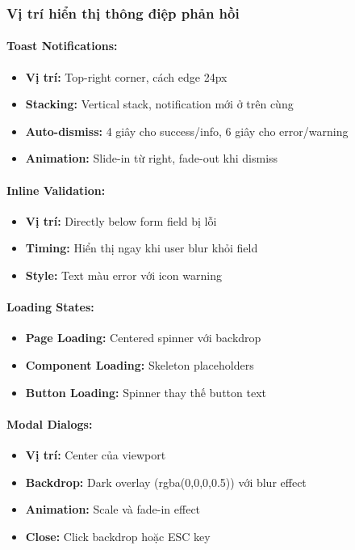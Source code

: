 \subsubsection{Vị trí hiển thị thông điệp phản hồi}

\paragraph{Toast Notifications:}
\begin{itemize}
    \item \textbf{Vị trí:} Top-right corner, cách edge 24px
    \item \textbf{Stacking:} Vertical stack, notification mới ở trên cùng
    \item \textbf{Auto-dismiss:} 4 giây cho success/info, 6 giây cho error/warning
    \item \textbf{Animation:} Slide-in từ right, fade-out khi dismiss
\end{itemize}

\paragraph{Inline Validation:}
\begin{itemize}
    \item \textbf{Vị trí:} Directly below form field bị lỗi
    \item \textbf{Timing:} Hiển thị ngay khi user blur khỏi field
    \item \textbf{Style:} Text màu error với icon warning
\end{itemize}

\paragraph{Loading States:}
\begin{itemize}
    \item \textbf{Page Loading:} Centered spinner với backdrop
    \item \textbf{Component Loading:} Skeleton placeholders
    \item \textbf{Button Loading:} Spinner thay thế button text
\end{itemize}

\paragraph{Modal Dialogs:}
\begin{itemize}
    \item \textbf{Vị trí:} Center của viewport
    \item \textbf{Backdrop:} Dark overlay (rgba(0,0,0,0.5)) với blur effect
    \item \textbf{Animation:} Scale và fade-in effect
    \item \textbf{Close:} Click backdrop hoặc ESC key
\end{itemize}

